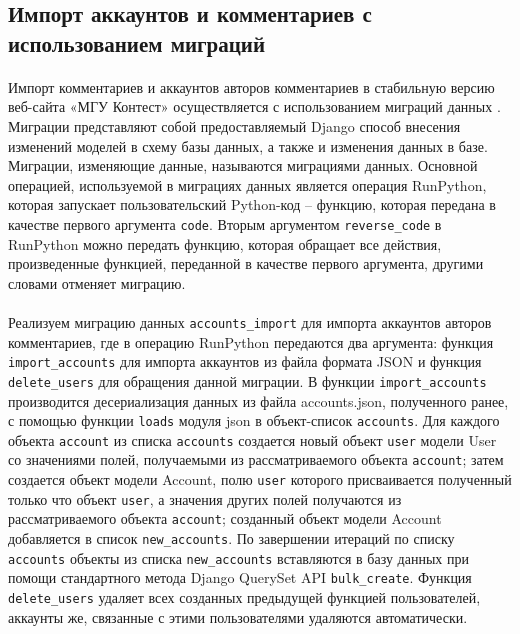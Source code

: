 \documentclass[12pt, a4paper, oneside]{article}
\begin{document}
\subsection{Импорт аккаунтов и комментариев с использованием миграций}
\paragraph{}
Импорт комментариев и аккаунтов авторов комментариев в стабильную версию веб-сайта «МГУ Контест» осуществляется с использованием миграций данных \cite{django-migrations}. Миграции представляют собой предоставляемый Django способ внесения изменений моделей в схему базы данных, а также и изменения данных в базе. Миграции, изменяющие данные, называются миграциями данных. Основной операцией, используемой в миграциях данных является операция RunPython, которая запускает пользовательский Python-код – функцию, которая передана в качестве первого аргумента \texttt{code}. Вторым аргументом \texttt{reverse\_code} в RunPython можно передать функцию, которая обращает все действия, произведенные функцией, переданной в качестве первого аргумента, другими словами отменяет миграцию.
\paragraph{}
Реализуем миграцию данных \texttt{accounts\_import} для импорта аккаунтов авторов комментариев, где в операцию RunPython передаются два аргумента: функция \texttt{import\_accounts} для импорта аккаунтов из файла формата JSON и функция \texttt{delete\_users} для обращения данной миграции. В функции \texttt{import\_accounts} производится десериализация данных из файла accounts.json, полученного ранее, с помощью функции \texttt{loads} модуля json в объект-список \texttt{accounts}. Для каждого объекта \texttt{account} из списка \texttt{accounts} создается новый объект \texttt{user} модели User со значениями полей, получаемыми из рассматриваемого объекта \texttt{account}; затем создается объект модели Account, полю \texttt{user} которого присваивается полученный только что объект \texttt{user}, а значения других полей получаются из рассматриваемого объекта \texttt{account}; созданный объект модели Account добавляется в список \texttt{new\_accounts}. По завершении итераций по списку \texttt{accounts} объекты из списка \texttt{new\_accounts} вставляются в базу данных при помощи стандартного метода Django QuerySet API \texttt{bulk\_create}. Функция \texttt{delete\_users} удаляет всех созданных предыдущей функцией пользователей, аккаунты же, связанные с этими пользователями удаляются автоматически.
\end{document}
